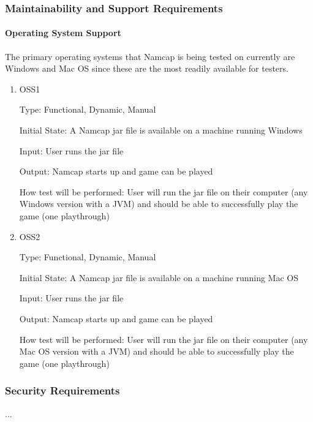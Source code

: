 \documentclass[12pt, titlepage]{article}
\begin{document}
\subsubsection{Maintainability and Support Requirements}

\paragraph{Operating System Support\\}
The primary operating systems that Namcap is being tested on currently are Windows and Mac OS since these are the most readily available for testers.

\begin{enumerate}

\item{OSS1\\}

Type: Functional, Dynamic, Manual
					
Initial State: A Namcap jar file is available on a machine running Windows
					
Input: User runs the jar file
					
Output: Namcap starts up and game can be played
					
How test will be performed: User will run the jar file on their computer (any Windows version with a JVM) and should be able to successfully play the game (one playthrough)

\item{OSS2\\}

Type: Functional, Dynamic, Manual
					
Initial State: A Namcap jar file is available on a machine running Mac OS
					
Input: User runs the jar file
					
Output: Namcap starts up and game can be played
					
How test will be performed: User will run the jar file on their computer (any Mac OS version with a JVM) and should be able to successfully play the game (one playthrough)

\end{enumerate}

\subsubsection{Security Requirements}

...
\end{document}
